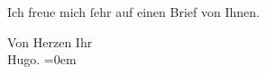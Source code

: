 \pstart
           Ich freue mich{ }ſehr auf einen Brief von Ihnen.\pend
           
\pstart
           Von Herzen Ihr{\\[\baselineskip]}\spacefill\mbox{Hugo.}\pend
           \leftskip=0em{}\endnumbering{}  \newcommand{\dateiname}{L01149}\newcommand{\titel}{Hugo von Hofmannsthal an Arthur Schnitzler, 18. 7. [1901]}\newcommand{\editorInnen}{Herausgegeben von Martin Anton Müller}
